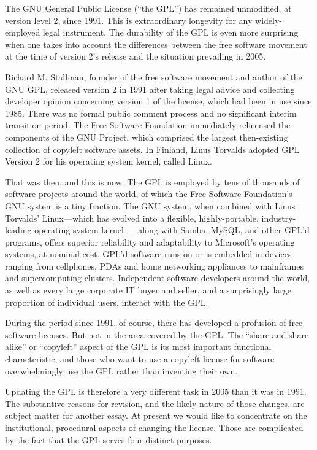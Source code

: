 \documentclass[11pt, letterpaper]{book}
\begin{document}
\smallskip

The GNU General Public License (``the GPL'') has remained
unmodified, at version level 2, since 1991.  This is extraordinary
longevity for any widely-employed legal instrument.  The durability of
the GPL is even more surprising when one takes into account the
differences between the free software movement at the time of version
2's release and the situation prevailing in 2005.

Richard M. Stallman, founder of the free software movement and author
of the GNU GPL, released version 2 in 1991 after taking legal advice
and collecting developer opinion concerning version 1 of the license,
which had been in use since 1985.  There was no formal public comment
process and no significant interim transition period.  The Free
Software Foundation immediately relicensed the components of the GNU
Project, which comprised the largest then-existing collection of
copyleft software assets.  In Finland, Linus Torvalds adopted GPL
Version 2 for his operating system kernel, called Linux.

That was then, and this is now.  The GPL is employed by tens of
thousands of software projects around the world, of which the Free
Software Foundation's GNU system is a tiny fraction.  The GNU system,
when combined with Linus Torvalds' Linux---which has evolved into a
flexible, highly-portable, industry-leading operating system kernel
--- along with Samba, MySQL, and other GPL'd programs, offers superior
reliability and adaptability to Microsoft's operating systems, at
nominal cost.  GPL'd software runs on or is embedded in devices
ranging from cellphones, PDAs and home networking appliances to
mainframes and supercomputing clusters.  Independent software
developers around the world, as well as every large corporate IT buyer
and seller, and a surprisingly large proportion of individual users,
interact with the GPL.

During the period since 1991, of course, there has developed a
profusion of free software licenses.  But not in the area covered by
the GPL.  The ``share and share alike'' or ``copyleft'' aspect of the
GPL is its most important functional characteristic, and those who
want to use a copyleft license for software overwhelmingly use the GPL
rather than inventing their own.

Updating the GPL is therefore a very different task in 2005 than it
was in 1991.  The substantive reasons for revision, and the likely
nature of those changes, are subject matter for another essay.  At
present we would like to concentrate on the institutional, procedural
aspects of changing the license.  Those are complicated by the fact
that the GPL serves four distinct purposes.
\end{document}
